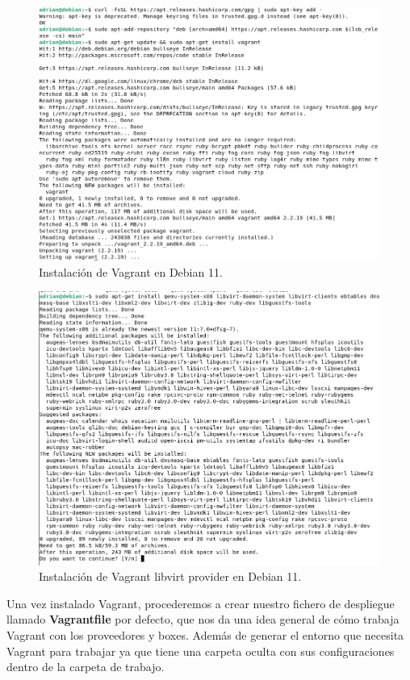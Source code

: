 \begin{figure}[H]
	\centering
	\includegraphics[scale=0.35]{img/vagrant0}
	\caption{Instalación de Vagrant en Debian 11.}
\end{figure}

\begin{figure}[H]
	\centering
	\includegraphics[scale=0.35]{img/vagrant7}
	\caption{Instalación de Vagrant libvirt provider en Debian 11.}
\end{figure}


Una vez instalado Vagrant, procederemos a crear nuestro fichero de despliegue llamado \textbf{Vagrantfile} por defecto, que nos da una idea general de cómo trabaja Vagrant con los proveedores y boxes. Además de generar el entorno que necesita Vagrant para trabajar ya que tiene una carpeta oculta con sus configuraciones dentro de la carpeta de trabajo.

